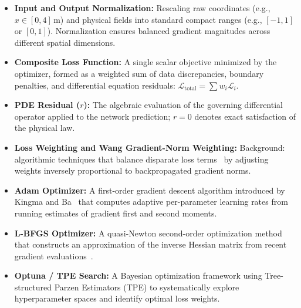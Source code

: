 \documentclass[11pt,a4paper]{article}
\begin{document}
\begin{itemize}[leftmargin=1.5em]
    \item \textbf{Input and Output Normalization:} Rescaling raw coordinates (e.g., $x \in [0, 4]\,\text{m}$) and physical fields into standard compact ranges (e.g., $[-1, 1]$ or $[0, 1]$). Normalization ensures balanced gradient magnitudes across different spatial dimensions.
    \item \textbf{Composite Loss Function:} A single scalar objective minimized by the optimizer, formed as a weighted sum of data discrepancies, boundary penalties, and differential equation residuals: $\mathcal{L}_{\mathrm{total}} = \sum w_i \mathcal{L}_i$.
    \item \textbf{PDE Residual ($r$):} The algebraic evaluation of the governing differential operator applied to the network prediction; $r=0$ denotes exact satisfaction of the physical law.
    \item \textbf{Loss Weighting and Wang Gradient-Norm Weighting:} Background: algorithmic techniques that balance disparate loss terms~\cite[Alg.~1, Eq.~(40), p.~10]{wang2021} by adjusting weights inversely proportional to backpropagated gradient norms.
    \item \textbf{Adam Optimizer:} A first-order gradient descent algorithm introduced by Kingma and Ba~\cite[Sec.~2, Algorithm~1, p.~2]{kingma2015} that computes adaptive per-parameter learning rates from running estimates of gradient first and second moments.
    \item \textbf{L-BFGS Optimizer:} A quasi-Newton second-order optimization method that constructs an approximation of the inverse Hessian matrix from recent gradient evaluations~\cite[Sec.~2.1, p.~6]{raissi2019}.
    \item \textbf{Optuna / TPE Search:} A Bayesian optimization framework using Tree-structured Parzen Estimators (TPE) to systematically explore hyperparameter spaces and identify optimal loss weights.
\end{itemize}

\end{document}
